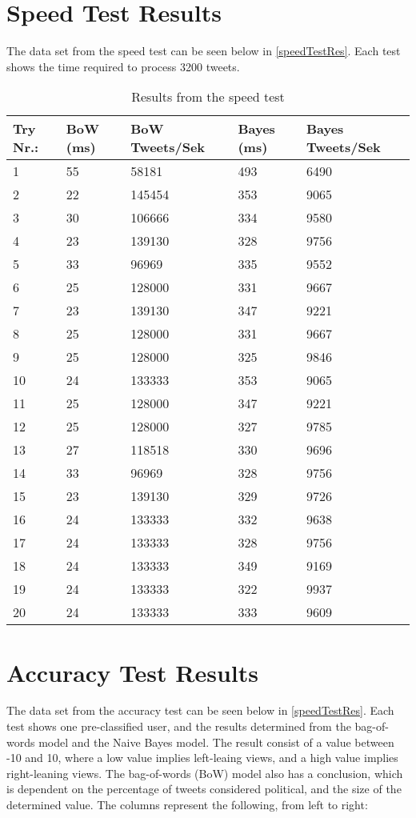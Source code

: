 \chapter{Speed Test Results}\label{app:speedTest}
The data set from the speed test can be seen below in \autoref{speedTestRes}.
Each test shows the time required to process 3200 tweets.

\begin{table}[H]\centering
\begin{tabular}{|l|l|l|l|l|}
\hline
Try Nr.:	&	BoW (ms)	&	BoW Tweets/Sek	&	Bayes (ms)	&	Bayes Tweets/Sek	\\\hline
1	&	55	&	58181	&	493	&	6490 \\\hline
2	&	22	&	145454	&	353	&	9065 \\\hline
3	&	30	&	106666	&	334	&	9580 \\\hline
4	&	23	&	139130	&	328	&	9756 \\\hline
5	&	33	&	96969	&	335	&	9552 \\\hline
6	&	25	&	128000	&	331	&	9667 \\\hline
7	&	23	&	139130	&	347	&	9221 \\\hline
8	&	25	&	128000	&	331	&	9667 \\\hline
9	&	25	&	128000	&	325	&	9846 \\\hline
10	&	24	&	133333	&	353	&	9065 \\\hline
11	&	25	&	128000	&	347	&	9221 \\\hline
12	&	25	&	128000	&	327	&	9785 \\\hline
13	&	27	&	118518	&	330	&	9696 \\\hline
14	&	33	&	96969	&	328	&	9756 \\\hline
15	&	23	&	139130	&	329	&	9726 \\\hline
16	&	24	&	133333	&	332	&	9638 \\\hline
17	&	24	&	133333	&	328	&	9756 \\\hline
18	&	24	&	133333	&	349	&	9169 \\\hline
19	&	24	&	133333	&	322	&	9937 \\\hline
20	&	24	&	133333	&	333	&	9609 \\\hline
\end{tabular}
\caption{Results from the speed test}
\label{speedTestRes}
\end{table}

\chapter{Accuracy Test Results}\label{app:speedTest}
The data set from the accuracy test can be seen below in \autoref{speedTestRes}.
Each test shows one pre-classified user, and the results determined from the
bag-of-words model and the Naive Bayes model. The result consist of a value
between -10 and 10, where a low value implies left-leaing views, and a high
value implies right-leaning views. The bag-of-words (BoW) model also has a
conclusion, which is dependent on the percentage of tweets considered political,
and the size of the determined value. The columns represent the following, from
left to right:\nl

